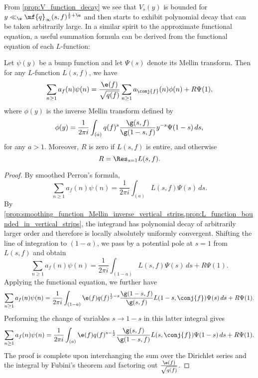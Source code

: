     From \cref{prop:V_function_decay} we see that $V_{s}(y)$ is bounded for $y \ll_{\e} \mf{q}_{\infty}(s,f)^{\frac{1}{2}+\e}$ and then starts to exhibit polynomial decay that can be taken arbitrarily large. In a similar spirit to the approximate functional equation, a useful summation formula can be derived from the functional equation of each $L$-function:

    \begin{theorem}
      Let $\psi(y)$ be a bump function and let $\Psi(s)$ denote its Mellin transform. Then for any $L$-function $L(s,f)$, we have
      \[
        \sum_{n \ge 1}a_{f}(n)\psi(n) = \frac{\e(f)}{\sqrt{q(f)}}\sum_{n \ge 1}a_{\conj{f}}(n)\phi(n)+R\Psi(1),
      \]
      where $\phi(y)$ is the inverse Mellin transform defined by
      \[
        \phi(y) = \frac{1}{2\pi i}\int_{(a)}q(f)^{s}\frac{\g(s,f)}{\g(1-s,f)}y^{-s}\Psi(1-s)\,ds,
      \]
      for any $a > 1$. Moreover, $R$ is zero if $L(s,f)$ is entire, and otherwise
      \[
        R = \Res_{s = 1}L(s,f).
      \]
    \end{theorem}
    \begin{proof}
      By smoothed Perron's formula,
      \[
        \sum_{n \ge 1}a_{f}(n)\psi(n) = \frac{1}{2\pi i}\int_{(a)}L(s,f)\Psi(s)\,ds.
      \]
      By \cref{prop:smoothing_function_Mellin_inverse_vertical_strips,prop:L_function_bounded_in_vertical_strips}, the integrand has polynomial decay of arbitrarily larger order and therefore is locally absolutely uniformly convergent. Shifting the line of integration to $(1-a)$, we pass by a potential pole at $s = 1$ from $L(s,f)$ and obtain
      \[
        \sum_{n \ge 1}a_{f}(n)\psi(n) = \frac{1}{2\pi i}\int_{(1-a)}L(s,f)\Psi(s)\,ds+R\Psi(1).
      \]
      Applying the functional equation, we further have
      \[
        \sum_{n \ge 1}a_{f}(n)\psi(n) = \frac{1}{2\pi i}\int_{(1-a)}\e(f)q(f)^{\frac{1}{2}-s}\frac{\g(1-s,f)}{\g(s,f)}L(1-s,\conj{f})\Psi(s)\,ds+R\Psi(1).
      \]
      Performing the change of variables $s \to 1-s$ in this latter integral gives
      \[
        \sum_{n \ge 1}a_{f}(n)\psi(n) = \frac{1}{2\pi i}\int_{(a)}\e(f)q(f)^{s-\frac{1}{2}}\frac{\g(s,f)}{\g(1-s,f)}L(s,\conj{f})\Psi(1-s)\,ds+R\Psi(1).
      \]
      The proof is complete upon interchanging the sum over the Dirichlet series and the integral by Fubini's theorem and factoring out $\frac{\e(f)}{\sqrt{q(f)}}$.
    \end{proof}
